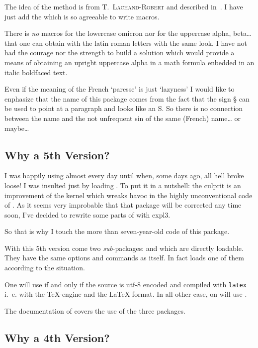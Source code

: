 \documentclass[full, english]{l3doc}
\begin{document}
The idea of the method is from T.~\textsc{Lachand-Robert} and described
in~\cite{tlachand}. I have just add the  which is so
agreeable to write macros.

There is \emph{no} macros for the lowercase omicron nor for the
uppercase alpha, beta\dots{} that one can obtain with the latin roman
letters with the same look. I have not had the courage nor the
strength to build a solution which would provide a means of obtaining
an upright uppercase alpha in a math formula enbedded in an italic
boldfaced text.

Even if the meaning of the French `paresse' is just `lazyness' I would
like to enphasize that the name of this package comes from the fact
that the sign § can be used to point at a paragraph and looks like an
S. So there is no connection between the name and the not unfrequent
sin of the same (French) name\dots{} or maybe\dots{}

\subsection{Why a 5th Version?}

I was happily using  almost every day until when, some days ago,
all hell broke loose! I was insulted just by loading . To put it in
a nutshell: the culprit is an improvement of the \LaTeXe{} kernel which wreaks
havoc in the highly unconventional code of . As it seems very
improbable that that package will be corrected any time soon, I've decided to
rewrite some parts of  with expl3.

So that is why I touch the more than seven-year-old code of this package.

With this 5th version come two \emph{sub}-packages:  and
 which are directly loadable. They have the same options and
commands as  itself. In fact  loads one of them
according to the situation.

One will use  if and only if the source is utf-8 encoded and
compiled with \texttt{latex} i.~e. with the \TeX-engine and the \LaTeX{}
format. In all other case, on will use .

The documentation of  covers the use of the three packages.

\subsection{Why a 4th Version?}
\end{document}
